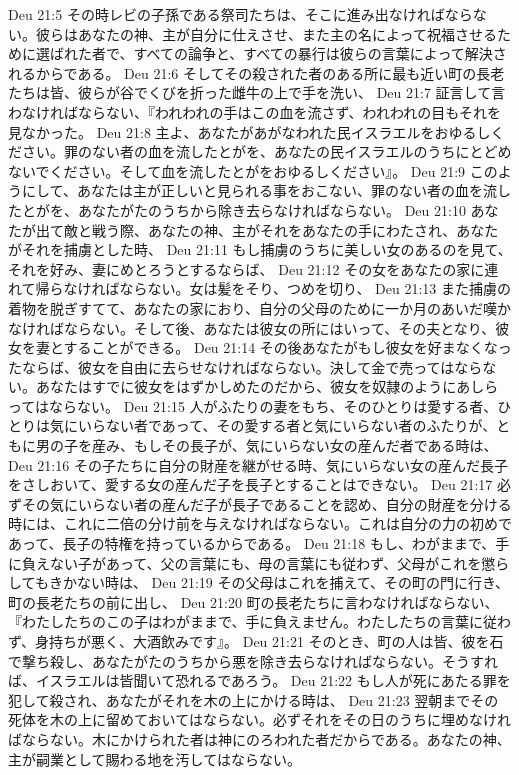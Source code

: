 Deu 21:5  その時レビの子孫である祭司たちは、そこに進み出なければならない。彼らはあなたの神、主が自分に仕えさせ、また主の名によって祝福させるために選ばれた者で、すべての論争と、すべての暴行は彼らの言葉によって解決されるからである。
Deu 21:6  そしてその殺された者のある所に最も近い町の長老たちは皆、彼らが谷でくびを折った雌牛の上で手を洗い、
Deu 21:7  証言して言わなければならない、『われわれの手はこの血を流さず、われわれの目もそれを見なかった。
Deu 21:8  主よ、あなたがあがなわれた民イスラエルをおゆるしください。罪のない者の血を流したとがを、あなたの民イスラエルのうちにとどめないでください。そして血を流したとがをおゆるしください』。
Deu 21:9  このようにして、あなたは主が正しいと見られる事をおこない、罪のない者の血を流したとがを、あなたがたのうちから除き去らなければならない。
Deu 21:10  あなたが出て敵と戦う際、あなたの神、主がそれをあなたの手にわたされ、あなたがそれを捕虜とした時、
Deu 21:11  もし捕虜のうちに美しい女のあるのを見て、それを好み、妻にめとろうとするならば、
Deu 21:12  その女をあなたの家に連れて帰らなければならない。女は髪をそり、つめを切り、
Deu 21:13  また捕虜の着物を脱ぎすてて、あなたの家におり、自分の父母のために一か月のあいだ嘆かなければならない。そして後、あなたは彼女の所にはいって、その夫となり、彼女を妻とすることができる。
Deu 21:14  その後あなたがもし彼女を好まなくなったならば、彼女を自由に去らせなければならない。決して金で売ってはならない。あなたはすでに彼女をはずかしめたのだから、彼女を奴隷のようにあしらってはならない。
Deu 21:15  人がふたりの妻をもち、そのひとりは愛する者、ひとりは気にいらない者であって、その愛する者と気にいらない者のふたりが、ともに男の子を産み、もしその長子が、気にいらない女の産んだ者である時は、
Deu 21:16  その子たちに自分の財産を継がせる時、気にいらない女の産んだ長子をさしおいて、愛する女の産んだ子を長子とすることはできない。
Deu 21:17  必ずその気にいらない者の産んだ子が長子であることを認め、自分の財産を分ける時には、これに二倍の分け前を与えなければならない。これは自分の力の初めであって、長子の特権を持っているからである。
Deu 21:18  もし、わがままで、手に負えない子があって、父の言葉にも、母の言葉にも従わず、父母がこれを懲らしてもきかない時は、
Deu 21:19  その父母はこれを捕えて、その町の門に行き、町の長老たちの前に出し、
Deu 21:20  町の長老たちに言わなければならない、『わたしたちのこの子はわがままで、手に負えません。わたしたちの言葉に従わず、身持ちが悪く、大酒飲みです』。
Deu 21:21  そのとき、町の人は皆、彼を石で撃ち殺し、あなたがたのうちから悪を除き去らなければならない。そうすれば、イスラエルは皆聞いて恐れるであろう。
Deu 21:22  もし人が死にあたる罪を犯して殺され、あなたがそれを木の上にかける時は、
Deu 21:23  翌朝までその死体を木の上に留めておいてはならない。必ずそれをその日のうちに埋めなければならない。木にかけられた者は神にのろわれた者だからである。あなたの神、主が嗣業として賜わる地を汚してはならない。
